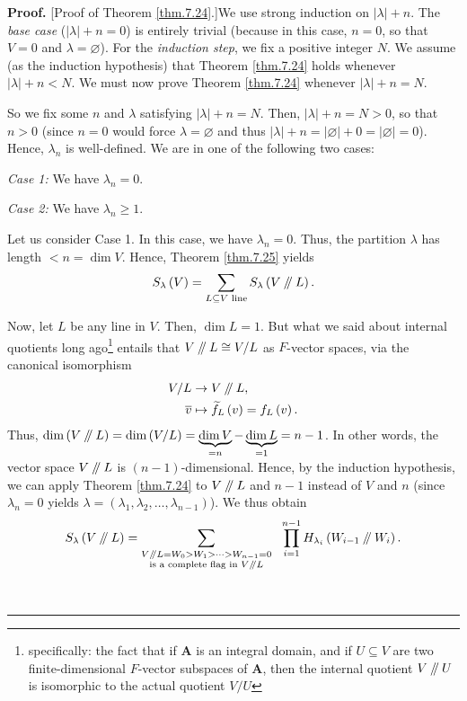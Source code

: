 \documentclass[numbers=enddot,12pt,final,onecolumn,notitlepage]{scrartcl}%
\numberwithin{exer}{section}
\theoremstyle{definition}
\newenvironment{proof}[1][Proof]{\noindent\textbf{#1.} }{\ \rule{0.5em}{0.5em}}
\let\sumnonlimits\sum
\let\prodnonlimits\prod
\renewcommand{\sum}{\sumnonlimits\limits}
\renewcommand{\prod}{\prodnonlimits\limits}
\newcommand{\sslash}{\mathbin{/\mkern-5mu/}}
\theoremstyle{plainsl}
\begin{document}
\begin{proof}
[Proof of Theorem \ref{thm.7.24}.]We use strong induction on $\left\vert
\lambda\right\vert +n$. The \textit{base case} ($\left\vert \lambda\right\vert
+n=0$) is entirely trivial (because in this case, $n=0$, so that $V=0$ and
$\lambda=\varnothing$). For the \textit{induction step}, we fix a positive
integer $N$. We assume (as the induction hypothesis) that Theorem
\ref{thm.7.24} holds whenever $\left\vert \lambda\right\vert +n<N$. We must
now prove Theorem \ref{thm.7.24} whenever $\left\vert \lambda\right\vert +n=N$.

So we fix some $n$ and $\lambda$ satisfying $\left\vert \lambda\right\vert
+n=N$. Then, $\left\vert \lambda\right\vert +n=N>0$, so that $n>0$ (since
$n=0$ would force $\lambda=\varnothing$ and thus $\left\vert \lambda
\right\vert +n=\left\vert \varnothing\right\vert +0=\left\vert \varnothing
\right\vert =0$). Hence, $\lambda_{n}$ is well-defined. We are in one of the
following two cases:

\textit{Case 1:} We have $\lambda_{n}=0$.

\textit{Case 2:} We have $\lambda_{n}\geq1$.

Let us consider Case 1. In this case, we have $\lambda_{n}=0$. Thus, the
partition $\lambda$ has length $<n=\dim V$. Hence, Theorem \ref{thm.7.25}
yields%
\begin{equation}
S_{\lambda}\left(  V\right)  =\sum_{L\subseteq V\text{ line}}S_{\lambda
}\left(  V\sslash L\right)  . \label{pf.thm.7.24.c1.1}%
\end{equation}


Now, let $L$ be any line in $V$. Then, $\dim L=1$. But what we said about
internal quotients long ago\footnote{specifically: the fact that if
$\mathbf{A}$ is an integral domain, and if $U\subseteq V$ are two
finite-dimensional $F$-vector subspaces of $\mathbf{A}$, then the internal
quotient $V\sslash U$ is isomorphic to the actual quotient $V/U$} entails that
$V\sslash L\cong V/L$ as $F$-vector spaces, via the canonical isomorphism%
\begin{align}
V/L  &  \rightarrow V\sslash L,\nonumber\\
\overline{v}  &  \mapsto\widetilde{f}_{L}\left(  v\right)  =f_{L}\left(
v\right)  . \label{pf.thm.7.24.c1.iso}%
\end{align}
Thus, $\dim\left(  V\sslash L\right)  =\dim\left(  V/L\right)
=\underbrace{\dim V}_{=n}-\underbrace{\dim L}_{=1}=n-1$. In other words, the
vector space $V\sslash L$ is $\left(  n-1\right)  $-dimensional. Hence, by the
induction hypothesis, we can apply Theorem \ref{thm.7.24} to $V\sslash L$ and
$n-1$ instead of $V$ and $n$ (since $\lambda_{n}=0$ yields $\lambda=\left(
\lambda_{1},\lambda_{2},\ldots,\lambda_{n-1}\right)  $). We thus obtain%
\begin{equation}
S_{\lambda}\left(  V\sslash L\right)  =\sum_{\substack{V\sslash L=W_{0}%
>W_{1}>\cdots>W_{n-1}=0\\\text{is a complete flag in }V\sslash L}%
}\ \ \prod_{i=1}^{n-1}H_{\lambda_{i}}\left(  W_{i-1}\sslash W_{i}\right)  .
\label{pf.thm.7.24.c1.2}%
\end{equation}



\end{proof}
\end{document}
